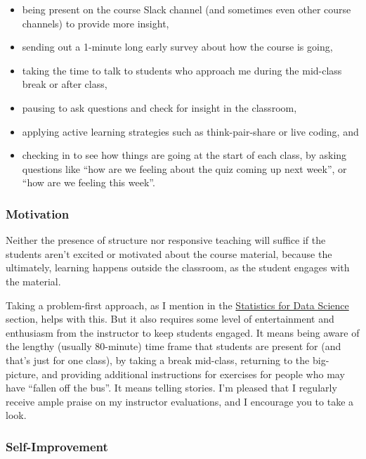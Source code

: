 \documentclass[]{article}
\providecommand{\tightlist}{%
  \setlength{\itemsep}{0pt}\setlength{\parskip}{0pt}}
\begin{document}
\begin{itemize}
\tightlist
\item
  being present on the course Slack channel (and sometimes even other course channels) to provide more insight,
\item
  sending out a 1-minute long early survey about how the course is going,
\item
  taking the time to talk to students who approach me during the mid-class break or after class,
\item
  pausing to ask questions and check for insight in the classroom,
\item
  applying active learning strategies such as think-pair-share or live coding, and
\item
  checking in to see how things are going at the start of each class, by asking questions like ``how are we feeling about the quiz coming up next week'', or ``how are we feeling this week''.
\end{itemize}

\hypertarget{motivation}{%
\subsubsection{Motivation}\label{motivation}}

Neither the presence of structure nor responsive teaching will suffice if the students aren't excited or motivated about the course material, because the ultimately, learning happens outside the classroom, as the student engages with the material.

Taking a problem-first approach, as I mention in the \protect\hyperlink{statistics-for-data-science}{Statistics for Data Science} section, helps with this. But it also requires some level of entertainment and enthusiasm from the instructor to keep students engaged. It means being aware of the lengthy (usually 80-minute) time frame that students are present for (and that's just for one class), by taking a break mid-class, returning to the big-picture, and providing additional instructions for exercises for people who may have ``fallen off the bus''. It means telling stories. I'm pleased that I regularly receive ample praise on my instructor evaluations, and I encourage you to take a look.

\hypertarget{self-improvement}{%
\subsubsection{Self-Improvement}\label{self-improvement}}
\end{document}
